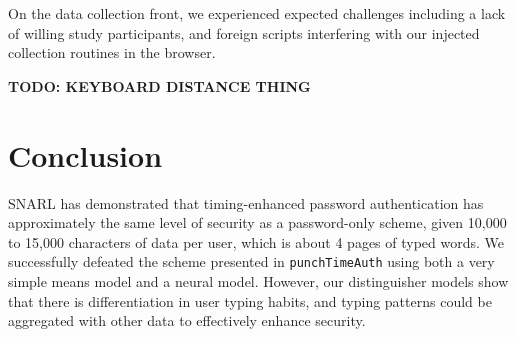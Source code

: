 \documentclass[9pt,journal]{IEEEtran}
\begin{document}
On the data collection front, we experienced expected challenges including a lack of willing study participants, and foreign scripts interfering with our injected collection routines in the browser.

\textbf{TODO: KEYBOARD DISTANCE THING}

\section{Conclusion}

SNARL has demonstrated that timing-enhanced password authentication has approximately the same level of security as a password-only scheme, given 10,000 to 15,000 characters of data per user, which is about 4 pages of typed words. We successfully defeated the scheme presented in \texttt{punchTimeAuth} using both a very simple means model and a neural model. However, our distinguisher models show that there is differentiation in user typing habits, and typing patterns could be aggregated with other data to effectively enhance security.

\pagebreak
\printbibliography
\end{document}
